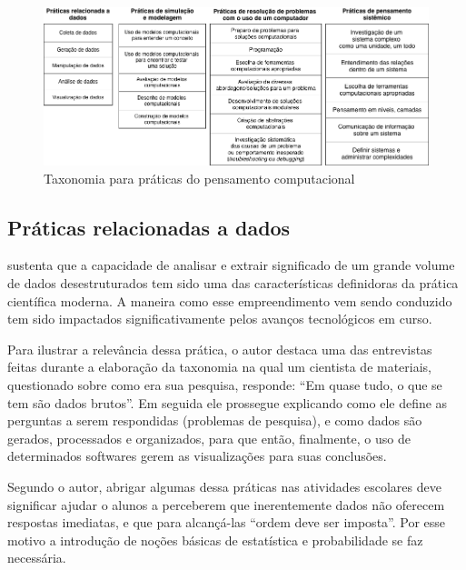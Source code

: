 \begin{landscape}
  \begin{center}
    \begin{figure}[!htb]
      \caption{Taxonomia para práticas do pensamento computacional}
      \begin{center}
          \includegraphics[scale=0.7]{imagens/taxonomia}
      \end{center}
      \label{fig:taxonomia}
    \end{figure}
  \end{center}
\end{landscape}

\subsection{Práticas relacionadas a dados}\label{sub-sec:pratica-de-dados}

 sustenta que a capacidade de analisar e extrair significado de um grande volume de dados desestruturados tem sido uma das características definidoras da prática científica moderna. A maneira como esse empreendimento vem sendo conduzido tem sido impactados significativamente pelos avanços tecnológicos em curso. 

Para ilustrar a relevância dessa prática, o autor destaca uma das entrevistas feitas durante a elaboração da taxonomia na qual um cientista de materiais, questionado sobre como era sua pesquisa, responde: ``Em quase tudo, o que se tem são dados brutos''. Em seguida ele prossegue explicando como ele define as perguntas a serem respondidas (problemas de pesquisa), e como dados são gerados, processados e organizados, para que então, finalmente, o uso de determinados softwares gerem as visualizações para suas conclusões. 


Segundo o autor, abrigar algumas dessa práticas nas atividades escolares deve significar ajudar o alunos a perceberem que inerentemente dados não oferecem respostas imediatas, e que para alcançá-las ``ordem deve ser imposta''. Por esse motivo a introdução de noções básicas de estatística e probabilidade se faz necessária.

